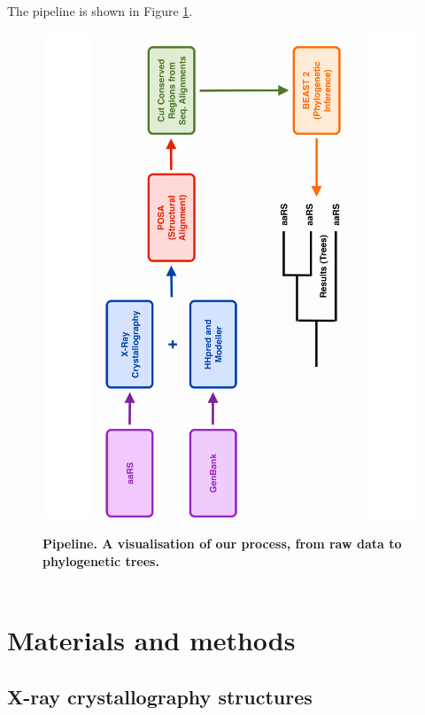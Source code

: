 \documentclass[10pt,letterpaper]{article}
\begin{document}
The pipeline is shown in Figure \ref{pipeline}.

\begin{figure}
  \caption{\bf Pipeline. A visualisation of our process, from raw data to phylogenetic trees.}
  \centering
    \includegraphics[width=\textwidth]{Pipeline.pdf}
  \label{pipeline}  
\end{figure}

\begin{eqnarray}
\label{eq:schemeP}
\end{eqnarray}

\section*{Materials and methods}
\subsection*{X-ray crystallography structures}
\end{document}
